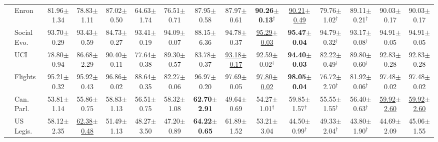 \begin{table}[t]
{\begin{tabular}{llccccccccccccc}
 & Enron & 81.96{\scriptsize$\pm$1.34} & 78.83{\scriptsize$\pm$1.11} & 87.02{\scriptsize$\pm$0.50} & 64.63{\scriptsize$\pm$1.74} & 76.51{\scriptsize$\pm$0.71} & 87.95{\scriptsize$\pm$0.58} & 87.97{\scriptsize$\pm$0.61} & \textbf{90.26{\scriptsize$\pm$0.13}}$^\dagger$ & \underline{90.21{\scriptsize$\pm$0.49}} & 79.76{\scriptsize$\pm$1.02}$^\dagger$ & 89.11{\scriptsize$\pm$0.21}$^\dagger$ & 90.03{\scriptsize$\pm$0.17} & 90.03{\scriptsize$\pm$0.17} \\
 & Social Evo. & 93.70{\scriptsize$\pm$0.29} & 93.43{\scriptsize$\pm$0.59} & 84.73{\scriptsize$\pm$0.27} & 93.41{\scriptsize$\pm$0.19} & 94.09{\scriptsize$\pm$0.07} & 88.15{\scriptsize$\pm$6.36} & 94.78{\scriptsize$\pm$0.37} & \underline{95.29{\scriptsize$\pm$0.03}} & \textbf{95.47{\scriptsize$\pm$0.04}} & 94.79{\scriptsize$\pm$0.32}$^\dagger$ & 93.17{\scriptsize$\pm$0.08}$^\dagger$ & 94.91{\scriptsize$\pm$0.05} & 94.91{\scriptsize$\pm$0.05} \\
 & UCI & 78.80{\scriptsize$\pm$0.94} & 86.68{\scriptsize$\pm$2.29} & 90.40{\scriptsize$\pm$0.11} & 77.64{\scriptsize$\pm$0.38} & 89.30{\scriptsize$\pm$0.57} & 83.78{\scriptsize$\pm$0.37} & \underline{93.18{\scriptsize$\pm$0.17}} & 92.59{\scriptsize$\pm$0.02}$^\dagger$ & \textbf{94.40{\scriptsize$\pm$0.03}} & 82.22{\scriptsize$\pm$0.49}$^\dagger$ & 89.80{\scriptsize$\pm$0.60}$^\dagger$ & 92.83{\scriptsize$\pm$0.28} & 92.83{\scriptsize$\pm$0.28} \\
 & Flights & 95.21{\scriptsize$\pm$0.32} & 95.92{\scriptsize$\pm$0.43} & 96.86{\scriptsize$\pm$0.02} & 88.64{\scriptsize$\pm$0.35} & 82.27{\scriptsize$\pm$0.06} & 96.97{\scriptsize$\pm$0.20} & 97.69{\scriptsize$\pm$0.05} & \underline{97.80{\scriptsize$\pm$0.02}} & \textbf{98.05{\scriptsize$\pm$0.04}} & 76.72{\scriptsize$\pm$2.70}$^\dagger$ & 81.92{\scriptsize$\pm$0.06}$^\dagger$ & 97.48{\scriptsize$\pm$0.02} & 97.48{\scriptsize$\pm$0.02} \\
 & Can. Parl. & 53.81{\scriptsize$\pm$1.14} & 55.86{\scriptsize$\pm$0.75} & 58.83{\scriptsize$\pm$1.13} & 56.51{\scriptsize$\pm$0.75} & 58.32{\scriptsize$\pm$1.08} & \textbf{62.70{\scriptsize$\pm$2.91}} & 49.64{\scriptsize$\pm$0.69} & 54.27{\scriptsize$\pm$1.01}$^\dagger$ & 59.85{\scriptsize$\pm$1.57}$^\dagger$ & 55.55{\scriptsize$\pm$1.55}$^\dagger$ & 56.40{\scriptsize$\pm$0.63}$^\dagger$ & \underline{59.92{\scriptsize$\pm$2.60}} & \underline{59.92{\scriptsize$\pm$2.60}} \\
 & US Legis. & 58.12{\scriptsize$\pm$2.35} & \underline{62.38{\scriptsize$\pm$0.48}} & 51.49{\scriptsize$\pm$1.13} & 48.27{\scriptsize$\pm$3.50} & 47.20{\scriptsize$\pm$0.89} & \textbf{64.22{\scriptsize$\pm$0.65}} & 61.89{\scriptsize$\pm$1.52} & 53.21{\scriptsize$\pm$3.04} & 44.50{\scriptsize$\pm$0.99}$^\dagger$ & 49.33{\scriptsize$\pm$2.04}$^\dagger$ & 43.80{\scriptsize$\pm$1.90}$^\dagger$ & 44.69{\scriptsize$\pm$2.09} & 45.06{\scriptsize$\pm$1.55} \\

\end{tabular}}
\end{table}
